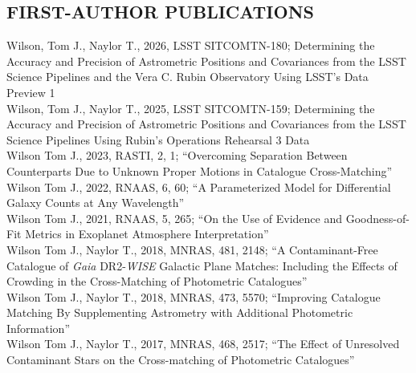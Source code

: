 \documentclass[letter, margin, 10pt]{res} %
\begin{document}
\begin{resume}
\parskip 5pt
\vspace{-2pt}
\section{FIRST-AUTHOR PUBLICATIONS}
Wilson, Tom J., Naylor T., 2026, LSST SITCOMTN-180; Determining the Accuracy and Precision of Astrometric Positions and Covariances from the LSST Science Pipelines and the Vera C. Rubin Observatory Using LSST's Data Preview 1\\
Wilson, Tom J., Naylor T., 2025, LSST SITCOMTN-159; Determining the Accuracy and Precision of Astrometric Positions and Covariances from the LSST Science Pipelines Using Rubin’s Operations Rehearsal 3 Data\\
Wilson Tom J., 2023, RASTI, 2, 1; ``Overcoming Separation Between Counterparts Due to Unknown Proper Motions in Catalogue Cross-Matching''\\
Wilson Tom J., 2022, RNAAS, 6, 60; ``A Parameterized Model for Differential Galaxy Counts at Any Wavelength''\\
Wilson Tom J., 2021, RNAAS, 5, 265; ``On the Use of Evidence and Goodness-of-Fit Metrics in Exoplanet Atmosphere Interpretation''\\
Wilson Tom J., Naylor T., 2018, MNRAS, 481, 2148; ``A Contaminant-Free Catalogue of \textit{Gaia} DR2-\textit{WISE} Galactic Plane Matches: Including the Effects of Crowding in the Cross-Matching of Photometric Catalogues''\vspace{2pt}\\
Wilson Tom J., Naylor T., 2018, MNRAS, 473, 5570; ``Improving Catalogue Matching By Supplementing Astrometry with Additional Photometric Information''\vspace{2pt}\\
Wilson Tom J., Naylor T., 2017, MNRAS, 468, 2517; ``The Effect of Unresolved Contaminant Stars on the Cross-matching of Photometric Catalogues''
\vspace{-5pt}

\end{resume}
\end{document}
